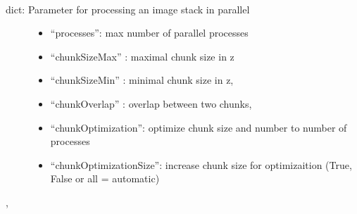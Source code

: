\documentclass[letterpaper,10pt,english]{sphinxmanual}
\begin{document}

\begin{fulllineitems}
\label{api/ClearMap.Parameter:ClearMap.Parameter.processStackParameter}~\begin{description}
\item[{dict: Parameter for processing an image stack in parallel}] \leavevmode\begin{itemize}
\item {} 
``processes'': max number of parallel processes

\item {} 
``chunkSizeMax'' : maximal chunk size in z

\item {} 
``chunkSizeMin'' : minimal chunk size in z,

\item {} 
``chunkOverlap'' : overlap between two chunks,

\item {} 
``chunkOptimization'': optimize chunk size and number to number of processes

\item {} 
``chunkOptimizationSize'': increase chunk size for optimizaition (True, False or all = automatic)

\end{itemize}

\end{description}




, {\hyperref[api/ClearMap.Parameter:ClearMap.Parameter.IlastikParameter]{\emph{}}}



\end{fulllineitems}

\end{document}
